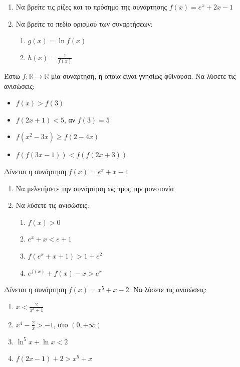 \documentclass{presentation}
\begin{document}
\begin{askisi}
  \begin{enumerate}
    \item Να βρείτε τις ρίζες και το πρόσημο της συνάρτησης $f(x)=e^x+2x-1$ \pause
    \item Να βρείτε το πεδίο ορισμού των συναρτήσεων:
          \begin{enumerate}
            \item $g(x)=\ln f(x)$ \pause
            \item $h(x)=\frac{1}{f(x)}$
          \end{enumerate}
  \end{enumerate}
\end{askisi}

\begin{askisi}
  Έστω $f:\mathbb{R}\to\mathbb{R}$ μία συνάρτηση, η οποία είναι γνησίως φθίνουσα. Να λύσετε τις ανισώσεις:
  \begin{itemize}
    \item $f(x)>f(3)$
    \item $f(2x+1)<5$, αν $f(3)=5$
    \item $f(x^2-3x)\ge f(2-4x)$
    \item $f\left(f(3x-1)\right)<f\left(f(2x+3)\right)$
  \end{itemize}
\end{askisi}

\begin{askisi}
  Δίνεται η συνάρτηση $f(x)=e^x+x-1$
  \begin{enumerate}
    \item Να μελετήσετε την συνάρτηση ως προς την μονοτονία \pause
    \item Να λύσετε τις ανισώσεις:
          \begin{enumerate}
            \item $f(x)>0$ \pause
            \item $e^x+x<e+1$ \pause
            \item $f(e^x+x+1)>1+e^2$ \pause
            \item $e^{f(x)}+f(x)-x>e^x$
          \end{enumerate}
  \end{enumerate}
\end{askisi}

\begin{askisi}
  Δίνεται η συνάρτηση $f(x)=x^5+x-2$. Να λύσετε τις ανισώσεις:
  \begin{enumerate}
    \item $x<\frac{2}{x^4+1}$ \pause
    \item $x^4-\frac{2}{x}>-1$, στο $(0,+\infty)$ \pause
    \item $\ln^5 x+\ln x<2$ \pause
    \item $f(2x-1)+2>x^5+x$
  \end{enumerate}
\end{askisi}
\end{document}
